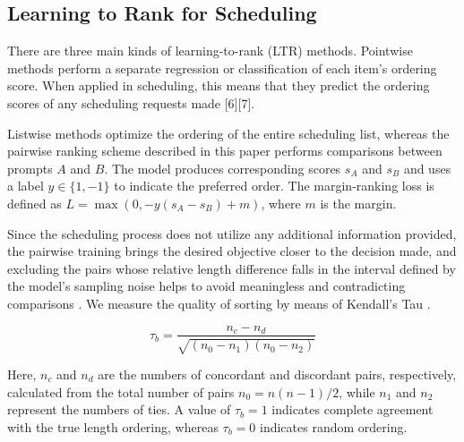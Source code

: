 \documentclass[conference]{IEEEtran}
\begin{document}
\subsection{Learning to Rank for Scheduling}
There are three main kinds of learning-to-rank (LTR) methods. Pointwise methods perform a separate regression or classification of each item's ordering score. When applied in scheduling, this means that they predict the ordering scores of any scheduling requests made [6][7].

Listwise methods optimize the ordering of the entire scheduling list, whereas
the pairwise ranking scheme described in this paper performs comparisons
between prompts $A$ and $B$. The model produces corresponding scores $s_A$
and $s_B$ and uses a label $y \in \{1,-1\}$ to indicate the preferred order.
The margin-ranking loss is defined as
$L=\max(0,-y(s_A-s_B)+m)$, where $m$ is the margin.

Since the scheduling process does not utilize any additional information provided, the pairwise training brings the desired objective closer to the decision made, and excluding the pairs whose relative length difference falls in the interval defined by the model's sampling noise helps to avoid meaningless and contradicting comparisons \cite{tao2025pars}. We measure the quality of sorting by means of Kendall's Tau \cite{kendall1938}.

\begin{equation}
\tau_b=\frac{n_c-n_d}
{\sqrt{(n_0-n_1)(n_0-n_2)}}
\end{equation}

Here, $n_c$ and $n_d$ are the numbers of concordant and discordant pairs,
respectively, calculated from the total number of pairs
$n_0 = n(n-1)/2$, while $n_1$ and $n_2$ represent the numbers of ties.
A value of $\tau_b = 1$ indicates complete agreement with the true length
ordering, whereas $\tau_b = 0$ indicates random ordering.
\end{document}
